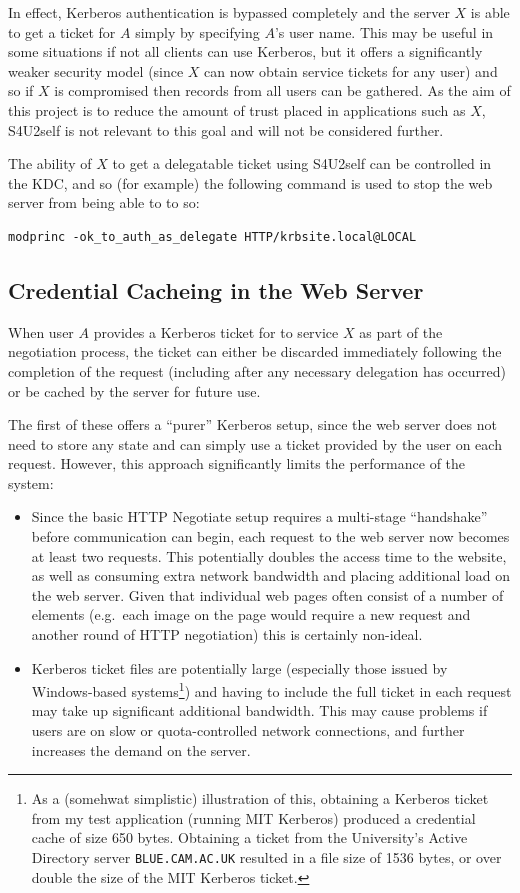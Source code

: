 \documentclass{article}
\begin{document}
In effect, Kerberos authentication is bypassed completely and the server $X$ is able to get a ticket for $A$ simply by specifying $A$'s user name. This may be useful in some situations if not all clients can use Kerberos, but it offers a significantly weaker security model (since $X$ can now obtain service tickets for any user) and so if $X$ is compromised then records from all users can be gathered. As the aim of this project is to reduce the amount of trust placed in applications such as $X$, S4U2self is not relevant to this goal and will not be considered further.

The ability of $X$ to get a delegatable ticket using S4U2self can be controlled in the KDC, and so (for example) the following command is used to stop the web server from being able to to so:

\begin{verbatim}
modprinc -ok_to_auth_as_delegate HTTP/krbsite.local@LOCAL
\end{verbatim}

\subsection{Credential Cacheing in the Web Server}
When user $A$ provides a Kerberos ticket for to service $X$ as part of the negotiation process, the ticket can either be discarded immediately following the completion of the request (including after any necessary delegation has occurred) or be cached by the server for future use.

The first of these offers a ``purer'' Kerberos setup, since the web server does not need to store any state and can simply use a ticket provided by the user on each request. However, this approach significantly limits the performance of the system:
\begin{itemize}
\item
  Since the basic HTTP Negotiate setup requires a multi-stage ``handshake'' before communication can begin, each request to the web server now becomes at least two requests. This potentially doubles the access time to the website, as well as consuming extra network bandwidth and placing additional load on the web server. Given that individual web pages often consist of a number of elements (e.g.\ each image on the page would require a new request and another round of HTTP negotiation) this is certainly non-ideal.
\item
  Kerberos ticket files are potentially large (especially those issued by Windows-based systems\footnote{As a (somehwat simplistic) illustration of this, obtaining a Kerberos ticket from my test application (running MIT Kerberos) produced a credential cache of size 650 bytes. Obtaining a ticket from the University's Active Directory server \texttt{BLUE.CAM.AC.UK} resulted in a file size of 1536 bytes, or over double the size of the MIT Kerberos ticket.}) and having to include the full ticket in each request may take up significant additional bandwidth. This may cause problems if users are on slow or quota-controlled network connections, and further increases the demand on the server.
\end{itemize}
\end{document}
